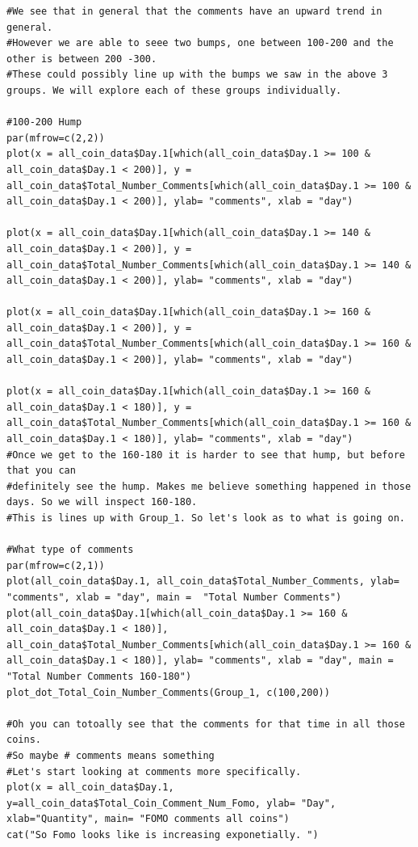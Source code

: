 \documentclass[12pt]{article}
\begin{document}
{\begin{verbatim}
#We see that in general that the comments have an upward trend in general. 
#However we are able to seee two bumps, one between 100-200 and the other is between 200 -300. 
#These could possibly line up with the bumps we saw in the above 3 groups. We will explore each of these groups individually.

#100-200 Hump
par(mfrow=c(2,2))
plot(x = all_coin_data$Day.1[which(all_coin_data$Day.1 >= 100 & all_coin_data$Day.1 < 200)], y = all_coin_data$Total_Number_Comments[which(all_coin_data$Day.1 >= 100 & all_coin_data$Day.1 < 200)], ylab= "comments", xlab = "day")

plot(x = all_coin_data$Day.1[which(all_coin_data$Day.1 >= 140 & all_coin_data$Day.1 < 200)], y = all_coin_data$Total_Number_Comments[which(all_coin_data$Day.1 >= 140 & all_coin_data$Day.1 < 200)], ylab= "comments", xlab = "day")

plot(x = all_coin_data$Day.1[which(all_coin_data$Day.1 >= 160 & all_coin_data$Day.1 < 200)], y = all_coin_data$Total_Number_Comments[which(all_coin_data$Day.1 >= 160 & all_coin_data$Day.1 < 200)], ylab= "comments", xlab = "day")

plot(x = all_coin_data$Day.1[which(all_coin_data$Day.1 >= 160 & all_coin_data$Day.1 < 180)], y = all_coin_data$Total_Number_Comments[which(all_coin_data$Day.1 >= 160 & all_coin_data$Day.1 < 180)], ylab= "comments", xlab = "day")
#Once we get to the 160-180 it is harder to see that hump, but before that you can 
#definitely see the hump. Makes me believe something happened in those days. So we will inspect 160-180. 
#This is lines up with Group_1. So let's look as to what is going on.

#What type of comments
par(mfrow=c(2,1))
plot(all_coin_data$Day.1, all_coin_data$Total_Number_Comments, ylab= "comments", xlab = "day", main =  "Total Number Comments")
plot(all_coin_data$Day.1[which(all_coin_data$Day.1 >= 160 & all_coin_data$Day.1 < 180)], all_coin_data$Total_Number_Comments[which(all_coin_data$Day.1 >= 160 & all_coin_data$Day.1 < 180)], ylab= "comments", xlab = "day", main =  "Total Number Comments 160-180")
plot_dot_Total_Coin_Number_Comments(Group_1, c(100,200))

#Oh you can totoally see that the comments for that time in all those coins. 
#So maybe # comments means something
#Let's start looking at comments more specifically.
plot(x = all_coin_data$Day.1, y=all_coin_data$Total_Coin_Comment_Num_Fomo, ylab= "Day", xlab="Quantity", main= "FOMO comments all coins")
cat("So Fomo looks like is increasing exponetially. ")


\end{verbatim}}
\end{document}
